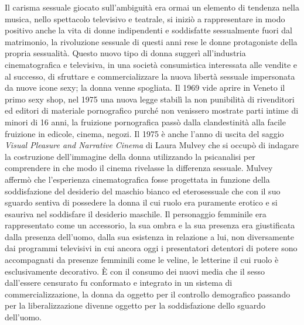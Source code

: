 Il carisma sessuale giocato sull'ambiguità era ormai un elemento di tendenza nella musica, nello spettacolo televisivo e teatrale, si iniziò a rappresentare in modo positivo anche la vita di donne indipendenti e soddisfatte sessualmente fuori dal matrimonio, la rivoluzione sessuale di questi anni rese le donne protagoniste della propria sessualità.
Questo nuovo tipo di donna suggerì all'industria cinematografica e televisiva, in una società consumistica interessata alle vendite e al successo, di sfruttare e commercializzare la nuova libertà sessuale impersonata da nuove icone sexy; la donna venne spogliata. 
Il 1969 vide aprire in Veneto il primo sexy shop, nel 1975 una nuova legge stabilì la non punibilità di rivenditori ed editori di materiale pornografico purché non venissero mostrate parti intime di minori di 16 anni, la fruizione pornografica passò dalla clandestinità alla facile fruizione in edicole, cinema, negozi.
Il 1975 è anche l'anno di uscita del saggio \textit{Visual Pleasure and Narrative Cinema} di Laura Mulvey che si occupò di indagare la costruzione dell'immagine della donna utilizzando la psicanalisi per comprendere in che modo il cinema rivelasse la differenza sessuale.
Mulvey affermò che l'esperienza cinematografica fosse progettata in funzione della soddisfazione del desiderio del maschio bianco ed eterosessuale che con il suo sguardo sentiva di possedere la donna il cui ruolo era puramente erotico e si esauriva nel soddisfare il desiderio maschile.
Il personaggio femminile era rappresentato come un accessorio, la sua ombra e la sua presenza era giustificata dalla presenza dell'uomo, dalla sua esistenza in relazione a lui, non diversamente dai programmi televisivi in cui ancora oggi i presentatori detentori di potere sono accompagnati da presenze femminili come le veline, le letterine il cui ruolo è esclusivamente decorativo.
È con il consumo dei nuovi media che il sesso dall'essere censurato fu conformato e integrato in un sistema di commercializzazione, la donna da oggetto per il controllo demografico passando per la liberalizzazione divenne oggetto per la soddisfazione dello sguardo dell'uomo.